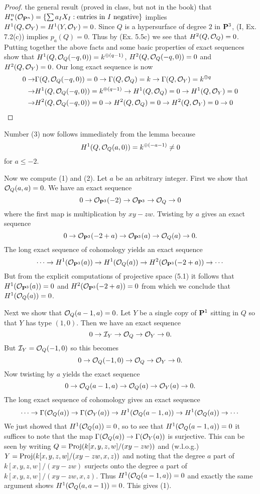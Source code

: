\documentclass[12pt]{article}
\begin{document}
\begin{exercise}
\begin{proof}
the general result (proved in class, but not in the book) 
that $H_{*}^n(\sO_{\P^n})=\{\sum a_{I}X_{I}:\text{entries in $I$ negative}\}$ 
implies $H^1(Q,\sO_Y)=H^1(Y,\sO_Y)=0$. Since $Q$ is a hypersurface
of degree $2$ in $\P^3$, (I, Ex. 7.2(c)) implies $p_a(Q)=0$. Thus
by (Ex. 5.5c) we see that $H^2(Q,\soq)=0$. Putting together the above
facts and some basic properties of exact sequences show that
$H^1(Q,\soq(-q,0))=k^{\oplus(q-1)}$, $H^2(Q,\soq(-q,0))=0$
and $H^2(Q,\so_Y)=0$. Our long exact sequence is now 
\begin{align*}
0\into&\Gamma(Q,\soq(-q,0))=0\into\Gamma(Q,\soq)=k\into\Gamma(Q,\sO_Y)=k^{\oplus{}q}\\
\into& H^1(Q,\soq(-q,0))=k^{\oplus(q-1)}\into{}H^1(Q,\soq)=0\into{}H^1(Q,\sO_Y)=0\\
\into& H^2(Q,\soq(-q,0))=0\into{}H^2(Q,\soq)=0\into{}H^2(Q,\sO_Y)=0\into 0
\end{align*}
\end{proof}

Number (3) now follows immediately from the lemma because 
$$H^1(Q,\soq(a,0))=k^{\oplus(-a-1)}\neq 0$$ for $a\leq -2.$

Now we compute (1) and (2). Let $a$ be an arbitrary integer.
First we show that $\soq(a,a)=0$. We have an exact sequence
$$0\into\sO_{\P^3}(-2)\into\sO_{\P^3}\into\sO_{Q}\into{}0$$
where the first map is multiplication by $xy-zw$. Twisting by $a$ 
gives an exact sequence
$$0\into\sO_{\P^3}(-2+a)\into\sO_{\P^3}(a)\into\sO_{Q}(a)\into{}0.$$
The long exact sequence of cohomology yields an exact sequence
$$\cdots\into H^1(\sO_{\P^3}(a))\into H^1(\sO_Q(a))\into
        H^2(\sO_{\P^3}(-2+a))\into\cdots$$
But from the explicit computations of projective space (5.1)
it follows that $H^1(\sO_{\P^3}(a))=0$ and $H^2(\sO_{\P^3}(-2+a))=0$
from which we conclude that $H^1(\sO_Q(a))=0$.

Next we show that $\soq(a-1,a)=0$. Let $Y$ be a single copy 
of $\P^1$ sitting in $Q$ so that $Y$ has type $(1,0)$. Then
we have an exact sequence
$$0\into\sI_Y\into\soq\into\sO_Y\into 0.$$
But $\sI_Y=\soq(-1,0)$ so this becomes
$$0\into\soq(-1,0)\into\soq\into\sO_Y\into 0.$$
Now twisting by $a$ yields the exact sequence
$$0\into\soq(a-1,a)\into\soq(a)\into\sO_Y(a)\into 0.$$
The long exact sequence of cohomology gives an exact sequence
$$\cdots\into\Gamma(\soq(a))\into\Gamma(\sO_Y(a))\into
       H^1(\soq(a-1,a))\into H^1(\soq(a))\into\cdots$$
We just showed that $H^1(\soq(a))=0$, so to see that
$H^1(\soq(a-1,a))=0$ it suffices to note that the
map $\Gamma(\soq(a))\into\Gamma(\sO_Y(a))$ is surjective.
This can be seen by writing $Q=\proj(k[x,y,z,w]/(xy-zw))$
and (w.l.o.g.) $Y=\proj(k[x,y,z,w]/(xy-zw,x,z))$ and
noting that the degree $a$ part of $k[x,y,z,w]/(xy-zw)$
surjects onto the degree $a$ part of $k[x,y,z,w]/(xy-zw,x,z)$. 
Thus $H^1(\soq(a-1,a))=0$ and exactly the same argument
shows $H^1(\soq(a,a-1))=0$. This gives (1). 


\end{exercise}
\end{document}
